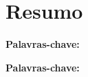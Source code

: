 \chapter*{Resumo}

\vspace{0.4cm}

\noindent 

\begin{labeling}{\textbf{Palavras-chave:}}
\item[\textbf{Palavras-chave:}] 

\end{labeling}

